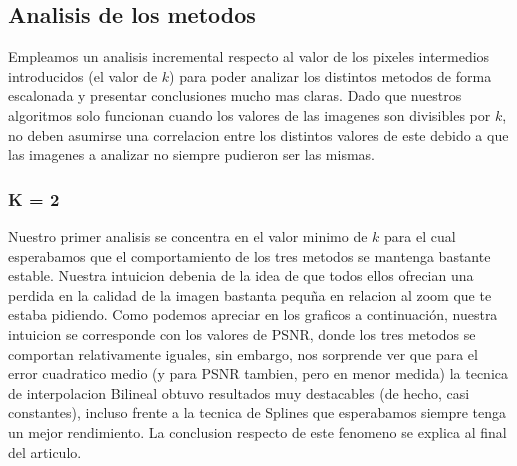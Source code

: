 \subsection{Analisis de los metodos}

Empleamos un analisis incremental respecto al valor de los pixeles intermedios introducidos (el valor de $k$) para poder analizar los distintos metodos de forma escalonada y presentar conclusiones mucho mas claras. Dado que nuestros algoritmos solo funcionan cuando los valores de las imagenes son divisibles por $k$, no deben asumirse una correlacion entre los distintos valores de este debido a que las imagenes a analizar no siempre pudieron ser las mismas.

\subsubsection{K = 2}
Nuestro primer analisis se concentra en el valor minimo de $k$ para el cual esperabamos que el comportamiento de los tres metodos se mantenga bastante estable. Nuestra intuicion debenia de la idea de que todos ellos ofrecian una perdida en la calidad de la imagen bastanta pequ\~na en relacion al zoom que te estaba pidiendo.
Como podemos apreciar en los graficos a continuación, nuestra intuicion se corresponde con los valores de PSNR, donde los tres metodos se comportan relativamente iguales, sin embargo, nos sorprende ver que para el error cuadratico medio (y para PSNR tambien, pero en menor medida) la tecnica de interpolacion Bilineal obtuvo resultados muy destacables (de hecho, casi constantes), incluso frente a la tecnica de Splines que esperabamos siempre tenga un mejor rendimiento. La conclusion respecto de este fenomeno se explica al final del articulo.

